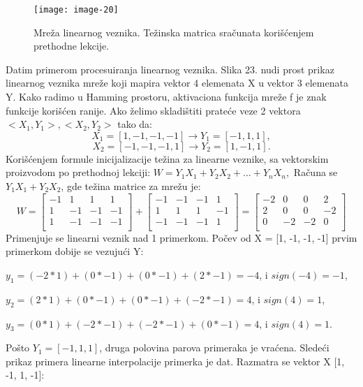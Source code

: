 \documentclass[fontsize=11bp, paper=a4]{scrarticle}
\begin{document}
\begin{figure}[h!]
    \centering
    \texttt{[image: image-20]}
    \caption{Mreža linearnog veznika. Težinska matrica sračunata korišćenjem prethodne lekcije.}
\end{figure}

Datim primerom procesuiranja linearnog veznika.
Slika 23. nudi prost prikaz linearnog veznika mreže koji mapira vektor 4 elemenata X u vektor 3 elemenata Y. Kako radimo u Hamming prostoru, aktivaciona funkcija mreže f je znak funkcije korišćen ranije. Ako želimo skladištiti prateće veze 2 vektora $<X_1, Y_1>, <X_2, Y_2>$ tako da:
$$ 
X_1 = [1, -1, -1, -1] \rightarrow Y_1 = [-1, 1, 1],
$$
$$ 
X_2 = [-1, -1, -1, 1] \rightarrow Y_2 = [1, -1, 1].
$$
Korišćenjem formule inicijalizacije težina za linearne veznike, sa vektorskim proizvodom po prethodnoj lekciji:
$W = Y_1X_1 + Y_2X_2 + ... + Y_nX_n,$
Računa se $Y_1X_1 + Y_2X_2$, gde težina matrice za mrežu je:
$$
W = \begin{bmatrix}
    -1 & 1 & 1 & 1 \\
    1 & -1 & -1 & -1 \\
    1 & -1 & -1 & -1 \\
\end{bmatrix} + \begin{bmatrix}
    -1 & -1 & -1 & 1 \\
    1 & 1 & 1 & -1 \\
    -1 & -1 & -1 & 1 \\
\end{bmatrix} = \begin{bmatrix}
    -2 & 0 & 0 & 2 \\
    2 & 0 & 0 & -2 \\
    0 & -2 & -2 & 0 \\
\end{bmatrix}
$$
Primenjuje se linearni veznik nad 1 primerkom. Počev od X = [1, -1, -1, -1] prvim primerkom dobije se vezujući Y:

$y_1 = (-2*1) + (0*-1) + (0*-1) + (2*-1) = -4$, i $sign(-4) = -1$,

$y_2 = (2*1) + (0*-1) + (0*-1) + (-2*-1) = 4$, i $sign(4) = 1$,

$y_3 = (0*1) + (-2*-1) + (-2*-1) + (0*-1) = 4$, i $sign(4) = 1$.

Pošto $Y_1 = [-1, 1, 1]$, druga polovina parova primeraka je vraćena.
Sledeći prikaz primera linearne interpolacije primerka je dat. Razmatra se vektor X [1, -1, 1, -1]:
\end{document}
